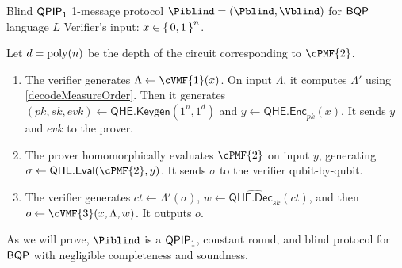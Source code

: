 \begin{protocol}{Blind $\operatorname{\mathsf{QPIP}}_1$ 1-message protocol $\Piblind = (\Pblind, \Vblind)$ for $\operatorname{\mathsf{BQP}}$ language $L$}
	\label{proto:BlindBQP}
	Verifier's input: $x\in\set{0,1}^n$.
	
	Let $d=\operatorname*{\operatorname{poly}}(n)$ be the depth of the circuit corresponding to $\cPMF{2}$.
	\begin{enumerate}
		\item The verifier generates $\Lambda\leftarrow\cVMF{1}(x)$.
			On input $\Lambda$, it computes $\Lambda'$ using \cref{decodeMeasureOrder}.
			Then it generates $(pk, sk, evk)\leftarrow\mathsf{QHE.Keygen}(1^n, 1^d)$ and $y\leftarrow\mathsf{QHE.Enc}_{pk}(x)$.
			It sends $y$ and $evk$ to the prover.
		\item The prover homomorphically evaluates $\cPMF{2}$ on input $y$, generating $\sigma\leftarrow\mathsf{QHE.Eval}(\cPMF{2}, y)$.
			It sends $\sigma$ to the verifier qubit-by-qubit.
		\item The verifier generates $ct\leftarrow\Lambda'(\sigma)$,
			$w\leftarrow\widehat{\mathsf{QHE.Dec}_{sk}}(ct)$,
			and then $o\leftarrow\cVMF{3}(x, \Lambda, w)$.
			It outputs $o$.
	\end{enumerate}
\end{protocol}


As we will prove, $\Piblind$ is a $\operatorname{\mathsf{QPIP}}_1$, constant round, and blind protocol for $\operatorname{\mathsf{BQP}}$ with negligible completeness and soundness.

